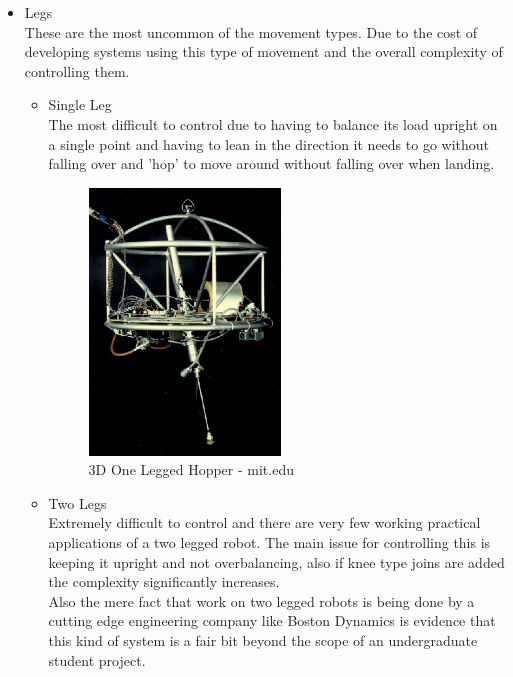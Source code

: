 \begin{itemize}
\item Legs
\\These are the most uncommon of the movement types.  Due to the cost of developing systems using this type of movement and the overall complexity of controlling them.
	\begin{itemize}
	\item Single Leg
	\\The most difficult to control due to having to balance its load upright on a single point and having to lean in the direction it needs to go without falling over and 'hop' to move around without falling over when landing.
\begin{figure}[h]
\centering
        \includegraphics[width=2.0in] {Images/3d-hopper.jpeg}
        \caption{3D One Legged Hopper - mit.edu}
        \label{3D One Legged Hopper}
\end{figure}
	\item Two Legs
	\\Extremely difficult to control and there are very few working practical applications of a two legged robot.  The main issue for controlling this is keeping it upright and not overbalancing, also if knee type joins are added the complexity significantly increases.
	\\Also the mere fact that work on two legged robots is being done by a cutting edge engineering company like Boston Dynamics \cite{boston} is evidence that this kind of system is a fair bit beyond the scope of an undergraduate student project.


\end{itemize}
\end{itemize}
